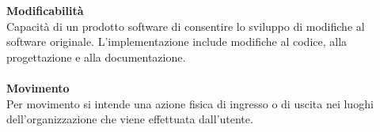 \textbf{Modificabilità}\\
Capacità di un prodotto software di consentire lo sviluppo di modifiche al software originale. L'implementazione include modifiche al codice, alla progettazione e alla documentazione.\\ \\
\textbf{Movimento}\\
Per movimento si intende una azione fisica di ingresso o di uscita nei luoghi dell'organizzazione che viene effettuata dall'utente. \\ \\
\clearpage
